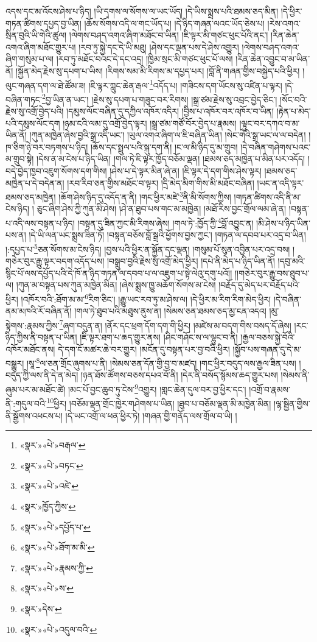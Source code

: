 འདས་དང་མ་འོངས་ཤེས་པ་ཉིད། །ཡི་དྭགས་ལ་སོགས་ལ་ཡང་ཡོད། །དེ་ཡིས་སྨྲས་པའི་ཐམས་ཅད་མིན། །དེ་ཕྱིར་གཏན་ཚིགས་དཔྱད་བྱ་ཡིན། །ཆོས་སོགས་འདི་ལ་གང་ཡོད་པ། །དེ་ཉིད་གཞན་ལའང་ཡོད་ཅེས་པ། །རེས་འགའ་སྲིན་བུའི་ཡི་གེའི་ཚུལ། །ལེགས་བཤད་འགའ་ཞིག་མཐོང་བ་ཡིན། །ཇི་ལྟར་མི་གཙང་ཕུང་པོའི་ནང་། །རིན་ཆེན་འགའ་ཞིག་མཐོང་གྱུར་པ། །རབ་ཏུ་སྐྱེ་དང་དེ་ཡི་མཐུ། །ཤེས་དང་ལྡན་པས་དེ་ཤེས་འགྱུར། །ལེགས་བཤད་འགའ་ཞིག་གསུམ་པ་ལ། །རབ་ཏུ་མཐོང་བའང་དེ་དང་འདྲ། །ཁྱིམ་སྲང་མི་གཙང་ཕུང་པོ་ལས། །རིན་ཆེན་འབྱུང་བ་མ་ཡིན་ནོ། །སྐྱོན་མེད་རྗེས་སུ་དཔག་པ་ཡིས། །རིགས་སམ་མི་རིགས་མ་དཔྱད་པར། །བློ་ནི་གཞན་གྱིས་བསྐྱེད་པའི་ཕྱིར། །ལུང་གཞན་དག་ལ་ཐེ་ཚོམ་ཟ། །ཇི་ལྟར་ཀླུང་ཆེན་རྒལ་\footnote{«སྣར་»«པེ་»བརྒལ་}འདོད་པ། །གཟིངས་དག་ཡོངས་སུ་འཛིན་པ་ལྟར། །དེ་བཞིན་གཏང་\footnote{«སྣར་»«པེ་»བཏང་}བྱ་ཡིན་ན་ཡང་། །རྗེས་སུ་དཔག་པ་གཟུང་བར་རིགས། །སྒྲ་ཙམ་རྗེས་སུ་འབྲང་བྱེད་ཅིང་། །སོང་བའི་རྗེས་སུ་འགྲོ་བྱེད་པའི། །དམུས་ལོང་བཞིན་དུ་དཀྱིལ་འཁོར་འདིར། །བྱིས་པ་འཁོར་བར་འཁོར་བ་ཡིན། །རྟེན་པ་མེད་པའི་དམུས་ལོང་དག །ཉམ་ངའི་ལམ་དུ་འགྲོ་བྱེད་ལྟར། །སྒྲ་ཙམ་གཙོ་བོར་བྱེད་པ་རྣམས། །ལྟུང་བར་དཀའ་བ་མ་ཡིན་ནོ། །ཀུན་མཁྱེན་ཞེས་བྱའི་སྒྲ་འདི་ཡང་། །ཡུལ་འགའ་ཞིག་ལ་ཇི་བཞིན་ཡིན། །སེང་གེའི་སྒྲ་ཡང་ལ་ལ་བདེན། །ཁ་ཅིག་ཉེ་བར་བཏགས་པ་ཉིད། །ཆོས་དང་སྤྲུལ་པའི་སྐུ་དག་ནི། །ང་ལ་མི་ཉིད་དུ་མ་གྲུབ། །དེ་བཞིན་གཤེགས་པའང་མ་གྲུབ་སྟེ། །དེས་ན་མ་ངེས་པ་ཉིད་ཡིན། །གལ་ཏེ་ཇི་ལྟར་ཁྱོད་བཅོམ་ལྡན། །ཐམས་ཅད་མཁྱེན་པ་མིན་པར་འདོད། །བདེ་བྱེད་ཁྱབ་འཇུག་སོགས་དག་གིས། །ཤེས་པ་དེ་ལྟར་མིན་ཞེ་ན། །ཇི་ལྟར་དེ་དག་གིས་ཤེས་ལྟར། །ཐམས་ཅད་མཁྱེན་པ་དེ་བདེན་ན། །རབ་རིབ་ཅན་གྱིས་མཐོང་བ་ལྟར། །དྲི་མེད་མིག་གིས་མི་མཐོང་བཞིན། །ཡང་ན་འདི་ལྟར་ཐམས་ཅད་མཁྱེན། །ཆོག་ཤེས་ཉིད་དུ་འདོད་ན་ནི། །གང་ཕྱིར་མཛེ་\footnote{«སྣར་»«པེ་»འཛེ་}ནི་མི་སོགས་ཀྱིས། །གཏན་ཚིགས་འདི་ནི་མ་ངེས་ཉིད། །
ཅུང་ཞིག་ཤེས་ཀྱི་ཀུན་མི་ཤེས། །ཤེ་ན་ཐུབ་པས་གང་མ་མཁྱེན། །མཐོ་རིས་བྱང་གྲོལ་ལམ་ཞེ་ན། །བསྟན་པ་འདི་ལས་བསྟན་པ་ཉིད། །བསྟན་དུ་ཟིན་ཀྱང་མི་རིགས་ཞེས། །གལ་ཏེ་:ཁྱོད་ཀྱི་\footnote{«སྣར་»ཁྱོད་ཀྱིས་}བློ་འབྱུང་ན། །མི་ཤེས་པ་ཉིད་ཡིན་པས་ན། །དེ་ཡི་ལན་ཡང་སྨྲས་ཟིན་ཏོ། །བསྟན་བཅོས་བློ་སྒྲའི་ཕྱོགས་བྱས་ཀྱང་། །གཏན་ལ་དབབ་པར་འདྲ་བ་ཡིན། །:དཔྱད་པ་\footnote{«སྣར་»«པེ་»དཔྱོད་པ་}ཅན་སོགས་མ་ངེས་ཉིད། །བྱས་པའི་ཕྱིར་ན་སྐྱོན་དང་ལྡན། །གསུམ་པོ་སུན་འབྱིན་པར་འདྲ་བས། །གཅེར་བུར་རྒྱུ་ལྟར་བདག་འདོད་པས། །བསྒྲུབ་བྱའི་རྗེས་སུ་འགྲོ་མེད་ཕྱིར། །དཔེ་ནི་མེད་པ་ཉིད་ཡིན་ནོ། །དབུ་མའི་སྙིང་པོ་ལས་དཔྱོད་པའི་དེ་ཁོ་ན་ཉིད་གཏན་ལ་དབབ་པ་ལ་འཇུག་པ་སྟེ་ལེའུ་དགུ་པའོ།། །།གཅེར་བུར་རྒྱུ་བས་ཐུབ་པ་ལ། །ཀུན་མ་བསྟན་པས་ཀུན་མཁྱེན་མིན། །ཞེས་སྨྲས་ཁྱུ་མཆོག་སོགས་མ་ངེས། །བརྗོད་དུ་མེད་པར་བརྗོད་པའི་ཕྱིར། །འཁོར་བའི་:ཐོག་མ་མ་\footnote{«སྣར་»«པེ་»ཐོག་མ་མི་}རིག་ཅིང་། །རྒྱུ་ཡང་རབ་ཏུ་མ་ཤེས་ལ། །དེ་ཕྱིར་མ་རིག་རིག་མེད་ཕྱིར། །དེ་བཞིན་ནམ་མཁའི་རོ་བཞིན་ནོ། །གལ་ཏེ་ཐུབ་པའི་མཐུས་ནུས་ན། །སེམས་ཅན་ཐམས་ཅད་མྱ་ངན་འདའ། །མུ་སྟེགས་:རྣམས་ཀྱིས་\footnote{«སྣར་»«པེ་»རྣམས་ཀྱི་}ཞག་བདུན་ན། །ནོར་དང་ཕྲག་དོག་དག་གི་ཕྱིར། །མཛེས་མ་བདག་གིས་བསད་དོ་ཞེས། །རང་ཉིད་ཀྱིས་ནི་བསྟན་པ་ཡིན། །ཇི་ལྟར་ཐག་པ་ཆད་གྱུར་ནས། །ཤིང་གཤོང་ས་ལ་ལྷུང་བ་ནི། །རྒྱལ་བཅས་སྐྱེ་བོའི་འཁོར་མཐོང་ནས། དེ་དག་ངོ་མཚར་ཆེ་བར་གྱུར། །མངོན་དུ་བསྟན་པར་བྱ་བའི་ཕྱིར། །སྐྱོབ་པས་གཞན་དུ་དེ་མ་བསྒྱུར། །སཱ་\footnote{«སྣར་»«པེ་»ས་}ལ་ཅན་གྲོང་ཞུགས་པ་ནི། །སེམས་ཅན་དོན་གྱི་བྱ་བ་མཛད། །གང་ཕྱིར་བདུད་ལས་རྒྱལ་ཟིན་པས། །བདུད་ཀྱི་ལས་ནི་དེ་ན་མེད། །ཉན་ཐོས་ཚོགས་བཅས་དཔའ་བོ་ནི། །དེར་ནི་བསོད་སྙོམས་ཆད་གྱུར་པས། །སེམས་ནི་ཞུམ་པར་མ་མཐོང་ཚེ། །མང་པོ་བྱང་ཆུབ་ཏུ་ངེས་\footnote{«སྣར་»དེས་}འགྱུར། །གླང་ཆེན་དུལ་བར་བྱ་ཕྱིར་དང་། །འགྲོ་བ་རྣམས་ནི་:གདུལ་བའི་\footnote{«སྣར་»«པེ་»འདུལ་བའི་}ཕྱིར། །བཅོམ་ལྡན་གྲོང་ཁྱེར་གཤེགས་པ་ཡིན། །ཐུབ་པ་བཅོམ་ལྡན་མི་མཁྱེན་མིན། །ལྷ་སྦྱིན་གྱིས་ནི་སྒྱོགས་འཕངས་པ། །དེ་ཡང་འགྲོ་ལ་ཕན་ཕྱིར་ཏེ། །གཞན་གྱི་གནོད་ལས་གྲོལ་བ་ཡི། །
